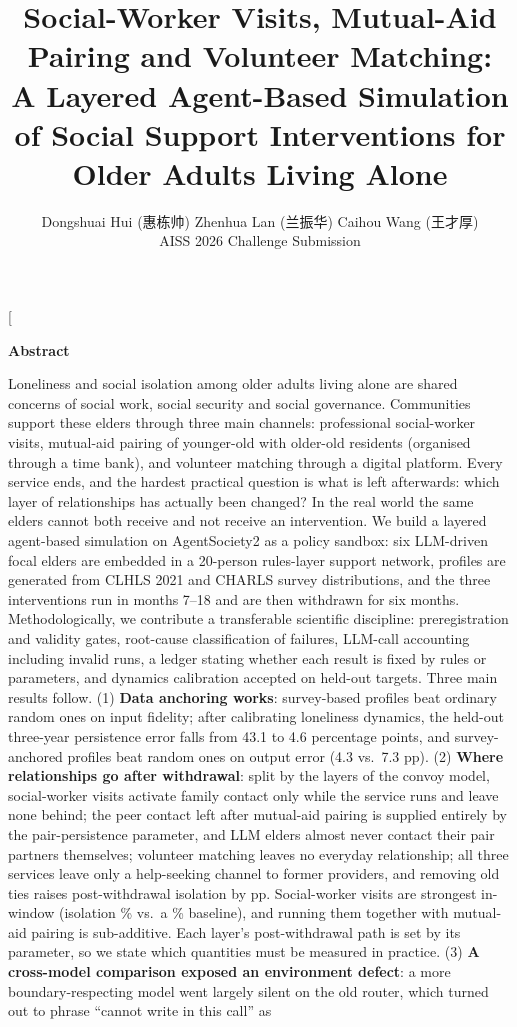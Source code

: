\documentclass[10pt,twocolumn]{article}
\title{\textbf{Social-Worker Visits, Mutual-Aid Pairing and Volunteer Matching:\\ A Layered Agent-Based Simulation of Social Support Interventions for Older Adults Living Alone}}
\author{Dongshuai Hui (惠栋帅) \quad Zhenhua Lan (兰振华) \quad Caihou Wang (王才厚)\\ \small AISS 2026 Challenge Submission}
\date{}
\begin{document}
\twocolumn[
\maketitle
\vspace{-2em}
\vspace{0.5em}
\begin{minipage}{\textwidth}
\begin{center}\textbf{Abstract}\end{center}
\small
Loneliness and social isolation among older adults living alone are shared concerns of social work, social security and social governance. Communities support these elders through three main channels: professional social-worker visits, mutual-aid pairing of younger-old with older-old residents (organised through a time bank), and volunteer matching through a digital platform. Every service ends, and the hardest practical question is what is left afterwards: which layer of relationships has actually been changed? In the real world the same elders cannot both receive and not receive an intervention. We build a layered agent-based simulation on AgentSociety2 as a policy sandbox: six LLM-driven focal elders are embedded in a 20-person rules-layer support network, profiles are generated from CLHLS 2021 and CHARLS survey distributions, and the three interventions run in months 7--18 and are then withdrawn for six months. Methodologically, we contribute a transferable scientific discipline: preregistration and validity gates, root-cause classification of failures, LLM-call accounting including invalid runs, a ledger stating whether each result is fixed by rules or parameters, and dynamics calibration accepted on held-out targets. Three main results follow. (1) \textbf{Data anchoring works}: survey-based profiles beat ordinary random ones on input fidelity; after calibrating loneliness dynamics, the held-out three-year persistence error falls from 43.1 to 4.6 percentage points, and survey-anchored profiles beat random ones on output error (4.3 vs.\ 7.3 pp). (2) \textbf{Where relationships go after withdrawal}: split by the layers of the convoy model, social-worker visits activate family contact only while the service runs and leave none behind; the peer contact left after mutual-aid pairing is supplied entirely by the pair-persistence parameter, and LLM elders almost never contact their pair partners themselves; volunteer matching leaves no everyday relationship; all three services leave only a help-seeking channel to former providers, and removing old ties raises post-withdrawal isolation by \LyCleanCwIso{} pp. Social-worker visits are strongest in-window (isolation \IsoIvCasework\% vs.\ a \IsoIvNone\% baseline), and running them together with mutual-aid pairing is sub-additive. Each layer's post-withdrawal path is set by its parameter, so we state which quantities must be measured in practice. (3) \textbf{A cross-model comparison exposed an environment defect}: a more boundary-respecting model went largely silent on the old router, which turned out to phrase ``cannot write in this call'' as 
\end{minipage}
\end{document}
